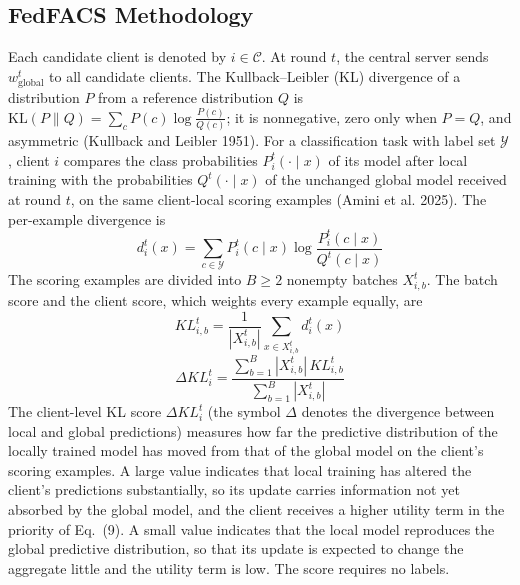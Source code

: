 \documentclass[pdflatex,sn-mathphys-num,oneside]{sn-jnl}%
\theoremstyle{thmstyleone}%
\theoremstyle{thmstyletwo}%
\theoremstyle{thmstylethree}%
\begin{document}
\subsection{FedFACS Methodology}
Each candidate client is denoted by $i \in \mathcal{C}$. At round $t$, the central server sends $w_{\text{global}}^t$ to all candidate clients. The Kullback--Leibler (KL) divergence of a distribution $P$ from a reference distribution $Q$ is $\mathrm{KL}(P \parallel Q)=\sum_{c}P(c)\log\frac{P(c)}{Q(c)}$; it is nonnegative, zero only when $P=Q$, and asymmetric (Kullback and Leibler 1951). For a classification task with label set $\mathcal{Y}$, client $i$ compares the class probabilities $P_i^t(\cdot\mid x)$ of its model after local training with the probabilities $Q^t(\cdot\mid x)$ of the unchanged global model received at round $t$, on the same client-local scoring examples (Amini et al. 2025). The per-example divergence is
\begin{equation}
d_i^t(x)=\sum_{c\in\mathcal{Y}}P_i^t(c\mid x)\log\frac{P_i^t(c\mid x)}{Q^t(c\mid x)}
\tag{5a}
\end{equation}
The scoring examples are divided into $B\ge 2$ nonempty batches $X_{i,b}^t$. The batch score and the client score, which weights every example equally, are
\begin{equation}
KL_{i,b}^t=\frac{1}{|X_{i,b}^t|}\sum_{x\in X_{i,b}^t}d_i^t(x)
\tag{5b}
\end{equation}
\begin{equation}
\Delta KL_i^t=\frac{\sum_{b=1}^{B}|X_{i,b}^t|\,KL_{i,b}^t}{\sum_{b=1}^{B}|X_{i,b}^t|}
\label{eq:kl}
\end{equation}
The client-level KL score $\Delta KL_i^t$ (the symbol $\Delta$ denotes the divergence between local and global predictions) measures how far the predictive distribution of the locally trained model has moved from that of the global model on the client's scoring examples. A large value indicates that local training has altered the client's predictions substantially, so its update carries information not yet absorbed by the global model, and the client receives a higher utility term in the priority of Eq.~(9). A small value indicates that the local model reproduces the global predictive distribution, so that its update is expected to change the aggregate little and the utility term is low. The score requires no labels.
\end{document}
